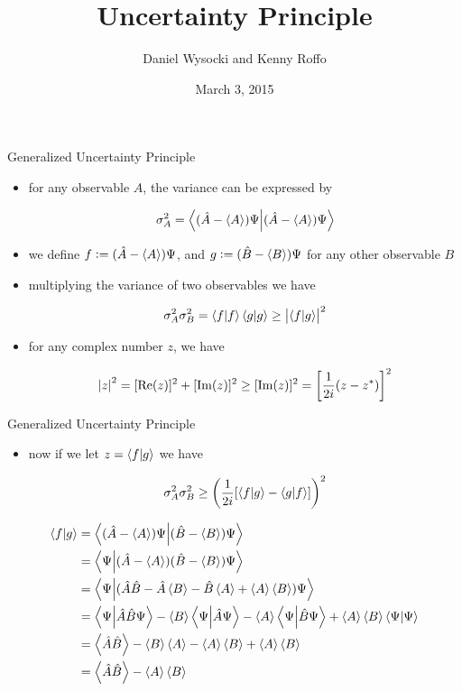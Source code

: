 \documentclass[ignorenonframetext,]{beamer}
\title{Uncertainty Principle}
\author{Daniel Wysocki and Kenny Roffo}
\date{March 3, 2015}
\begin{document}
\frame{\titlepage}

\begin{frame}{Generalized Uncertainty Principle}

\begin{itemize}
\item
  for any observable \(A\), the variance can be expressed by

  \begin{displaymath}
  \sigma_A^2=\braket{(\hat{A}-\expval{A})\Psi}{(\hat{A}-\expval{A})\Psi}
  \end{displaymath}
\item
  we define \(f:=(\hat{A}-\expval{A})\Psi\), and
  \(g:=(\hat{B}-\expval{B})\Psi\) for any other observable \(B\)
\item
  multiplying the variance of two observables we have

  \begin{displaymath}
  \sigma_A^2\sigma_B^2=\braket{f}\braket{g}\ge \abs{\braket{f}{g}}^2
  \end{displaymath}
\item
  for any complex number \(z\), we have

  \begin{displaymath}
  \abs{z}^2=[\Re(z)]^2+[\Im(z)]^2\ge[\Im(z)]^2=\left[\frac{1}{2i}(z-z^*)\right]^2
  \end{displaymath}
\end{itemize}

\end{frame}

\begin{frame}{Generalized Uncertainty Principle}

\begin{itemize}
\itemsep1pt\parskip0pt
\item
  now if we let \(z=\braket{f}{g}\) we have

  \begin{displaymath}
  \sigma_A^2\sigma_B^2\ge\left(\frac{1}{2i}[\braket{f}{g}-\braket{g}{f}]\right)^2
  \end{displaymath}
\end{itemize}

\begin{align*}
\braket{f}{g} &= \braket{(\hat{A}-\expval{A})\Psi}{(\hat{B}-\expval{B})\Psi}
\\
&=\braket{\Psi}{(\hat{A}-\expval{A})(\hat{B}-\expval{B})\Psi}
\\
&=\braket{\Psi}{(\hat{A}\hat{B}-\hat{A}\expval{B}-\hat{B}\expval{A}+\expval{A}\expval{B})\Psi}
\\
&=\braket{\Psi}{\hat{A}\hat{B}\Psi}-\expval{B}\braket{\Psi}{\hat{A}\Psi}-\expval{A}\braket{\Psi}{\hat{B}\Psi}+\expval{A}\expval{B}\braket{\Psi}{\Psi}
\\
&=\expval{\hat{A}\hat{B}}-\expval{B}\expval{A}-\expval{A}\expval{B}+\expval{A}\expval{B}
\\
&=\expval{\hat{A}\hat{B}}-\expval{A}\expval{B}
\end{align*}

\end{frame}
\end{document}
